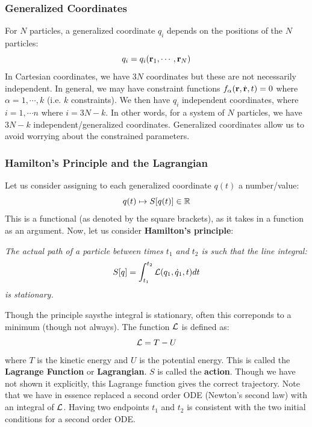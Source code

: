 \documentclass[../PHYS306Notes.tex]{subfiles}
\begin{document}
\subsubsection{Generalized Coordinates}
For $N$ particles, a generalized coordinate $q_i$ depends on the positions of the $N$ particles:
\[q_i = q_i(\mathbf{r}_1, \cdots, \mathbf{r}_N)\]
In Cartesian coordinates, we have $3N$ coordinates but these are not necessarily independent. In general, we may have constraint functions $f_\alpha(\mathbf{r}, \dot{\mathbf{r}}, t) = 0$ where $\alpha = 1, \cdots, k$ (i.e. $k$ constraints). We then have $q_i$ independent coordinates, where $i = 1, \cdots n$ where $i = 3N - k$. In other words, for a system of $N$ particles, we have $3N - k$ independent/generalized coordinates. Generalized coordinates allow us to avoid worrying about the constrained parameters. 
\subsubsection{Hamilton's Principle and the Lagrangian}
Let us consider assigning to each generalized coordinate $q(t)$ a number/value:
\[q(t) \mapsto S[q(t)] \in \mathbb{R}\]
This is a functional (as denoted by the square brackets), as it takes in a function as an argument. Now, let us consider \textbf{Hamilton's principle}:
\begin{center}
    \textit{The actual path of a particle between times $t_1$ and $t_2$ is such that the line integral:
    \[ S[q] = \int_{t_1}^{t_2} \mathcal{L}(q_1, \dot{q}_1, t) dt\]
    is stationary.}
\end{center}
Though the principle saysthe integral is stationary, often this correponds to a minimum (though not always). The function $\mathcal{L}$ is defined as:
\[\mathcal{L} = T - U\]
where $T$ is the kinetic energy and $U$ is the potential energy. This is called the \textbf{Lagrange Function} or \textbf{Lagrangian}. $S$ is called the \textbf{action}. Though we have not shown it explicitly, this Lagrange function gives the correct trajectory. Note that we have in essence replaced a second order ODE (Newton's second law) with an integral of $\mathcal{L}$. Having two endpoints $t_1$ and $t_2$ is consistent with the two initial conditions for a second order ODE. 
\end{document}
